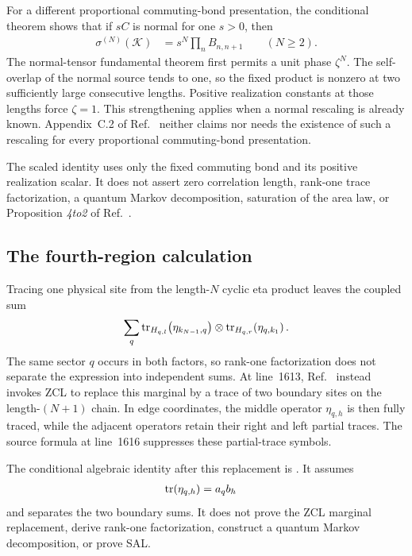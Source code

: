 \documentclass{article}
\begin{document}
For a different proportional commuting-bond presentation, the conditional
theorem
shows that if $sC$ is normal for one $s>0$, then
\begin{align}
    \sigma^{(N)}(\mathcal K)
        &=s^N\prod_n B_{n,n+1}
        \qquad(N\geq2).
    \label{eq:cpsv16_commuting_form_to_sal_normal_rescaling_product_identity}
\end{align}
The normal-tensor fundamental theorem first permits a unit phase $\zeta^N$.
The self-overlap of the normal source tends to one, so the fixed product is
nonzero at two sufficiently large consecutive lengths. Positive realization
constants at those lengths force $\zeta=1$. This strengthening applies when a
normal rescaling is already known. Appendix~C.2 of
Ref.~\cite{Cirac2016MPDO_arXiv} neither claims nor needs the existence of such
a rescaling for every proportional commuting-bond presentation.

The scaled identity uses only the fixed commuting bond and its positive
realization scalar. It does not assert zero correlation length, rank-one trace
factorization, a quantum Markov decomposition, saturation of the area law, or
Proposition \emph{4to2} of Ref.~\cite{Cirac2016MPDO_arXiv}.

\subsection{The fourth-region calculation}

Tracing one physical site from the length-$N$ cyclic eta product leaves the
coupled sum
\begin{align}
    \sum_q
        \operatorname{tr}_{H_{q,l}}\!\left(\eta_{k_{N-1},q}\right)
        \otimes
        \operatorname{tr}_{H_{q,r}}\!\left(\eta_{q,k_1}\right).
    \label{eq:cpsv16_commuting_form_to_sal_one_site_traced_eta_boundary_sum}
\end{align}
The same sector $q$ occurs in both factors, so rank-one factorization does not
separate the expression into independent sums. At line~1613,
Ref.~\cite{Cirac2016MPDO_arXiv} instead invokes ZCL to replace this marginal
by a trace of two boundary sites on the length-$(N+1)$ chain. In edge
coordinates, the middle operator $\eta_{q,h}$ is then fully traced, while the
adjacent operators retain their right and left partial traces. The source
formula at line~1616 suppresses these partial-trace symbols.

The conditional algebraic identity after this replacement is
. It assumes
\begin{align}
    \operatorname{tr}(\eta_{q,h})
        &=a_qb_h
    \label{eq:cpsv16_commuting_form_to_sal_rank_one_eta_trace_assumption}
\end{align}
and separates the two boundary sums. It does not prove the ZCL marginal
replacement, derive rank-one factorization, construct a quantum Markov
decomposition, or prove SAL.
\end{document}
